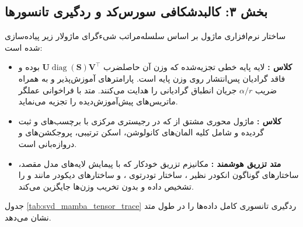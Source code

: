 \subsection*{بخش ۳: کالبدشکافی سورس‌کد و ردگیری تانسورها }
ساختار نرم‌افزاری ماژول  بر اساس سلسله‌مراتب شیءگرای ماژولار زیر پیاده‌سازی شده است:
\begin{itemize}
    \item \textbf{کلاس :} لایه پایه خطی تجزیه‌شده که وزن آن حاصلضرب $\mathbf{U} \operatorname{diag}(\mathbf{S}) \mathbf{V}^\top$ بوده و فاقد گرادیان پس‌انتشار روی وزن پایه  است. پارامترهای آموزش‌پذیر  و  به همراه ضریب $\alpha/r$ جریان انطباق گرادیانی را هدایت می‌کنند. متد  با فراخوانی عملگر  ماتریس‌های پیش‌آموزش‌دیده را تجزیه می‌نماید.
    \item \textbf{کلاس :} ماژول محوری مشتق از  که در رجیستری مرکزی با برچسب‌های  و  ثبت گردیده و شامل کلیه المان‌های کانولوشن، اسکن ترتیبی، پروجکشن‌های  و دروازه‌بانی است.
    \item \textbf{متد تزریق هوشمند :} مکانیزم تزریق خودکار که با پیمایش لایه‌های مدل مقصد، ساختارهای گوناگون انکودر نظیر  ، ساختار تودرتوی  ، و ساختارهای دیکودر مانند   و   را تشخیص داده و بدون تخریب وزن‌ها جایگزین می‌کند.
\end{itemize}

جدول \ref{tab:svd_mamba_tensor_trace} ردگیری تانسوری کامل داده‌ها را در طول متد  نشان می‌دهد.

